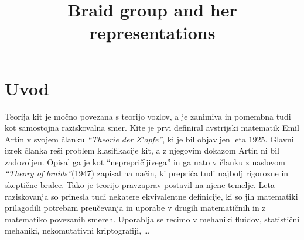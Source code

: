 \documentclass[mat1]{fmfdelo}
\title{Braid group and her representations}
\begin{document}
\section{Uvod}

Teorija kit je močno povezana s teorijo vozlov, a je zanimiva in pomembna tudi kot samostojna raziskovalna smer. Kite je prvi definiral avstrijski matematik Emil Artin v svojem članku \emph{``Theorie der Z\''{o}pfe''}, ki je bil objavljen leta $1925$. Glavni izrek članka reši problem klasifikacije kit, a z njegovim dokazom Artin ni bil zadovoljen. Opisal ga je kot ``neprepričljivega'' in ga nato v članku z naslovom \emph{``Theory of braids''}(1947) zapisal na način, ki prepriča tudi najbolj rigorozne in skeptične bralce. Tako je teorijo pravzaprav postavil na njene temelje. Leta raziskovanja so prinesla tudi nekatere ekvivalentne definicije, ki so jih matematiki prilagodili potrebam preučevanja in uporabe v drugih matematičnih in z matematiko povezanih smereh. Uporablja se recimo v mehaniki fluidov, statistični mehaniki, nekomutativni kriptografiji, \ldots

%
%
%
%
%
%
%
%
\break
\end{document}
